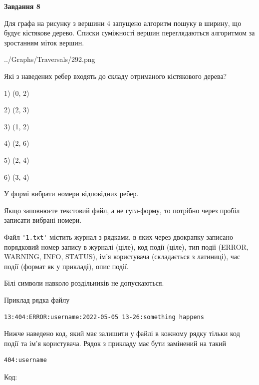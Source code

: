 \documentclass[12pt, ukrainian]{article}
\def\code#1{\Verb!#1!}
\begin{document}
{\begin {large}
{\begin {center}\textbf{Завдання 8}\end {center}}\par
Для графа на рисунку з вершини 4 запущено алгоритм пошуку в ширину, що будує кістякове дерево. Списки суміжності вершин переглядаються алгоритмом за зростанням міток вершин.\par
\begin{center}
	{../Graphs/Traversals/292.png}
\end{center}
\par Які з наведених ребер входять до складу отриманого кістякового дерева?\par
1) (0, 2)\par
2) (2, 3)\par
3) (1, 2)\par
4) (2, 6)\par
5) (2, 4)\par
6) (3, 4)\par
{\vskip 15pt} У формі вибрати номери відповідних ребер.


Якщо заповнюєте текстовий файл, а не гугл-форму, то потрібно через пробіл записа\-ти вибрані номери.\par
\newpage


Файл \code{'1.txt'} містить журнал з рядками, в яких через двокрапку записано поряд\-ко\-вий номер запису в журналі (ціле), код події (ціле), тип події (ERROR, \\WARNING, INFO, STATUS), ім'я користувача (складається з латиниці), час події (фор\-мат як у прикладі), опис події.

Білі символи навколо роздільників не допускаються.

Приклад рядка файлу



\begin{verbatim}
13:404:ERROR:username:2022-05-05 13-26:something happens
\end{verbatim}


Нижче наведено код, який має залишити у файлі в кожному рядку тільки код події та ім'я користувача. Рядок з прикладу має бути замінений на такий



\begin{verbatim}
404:username
\end{verbatim}




Код:




\end{large}}
\end{document}
